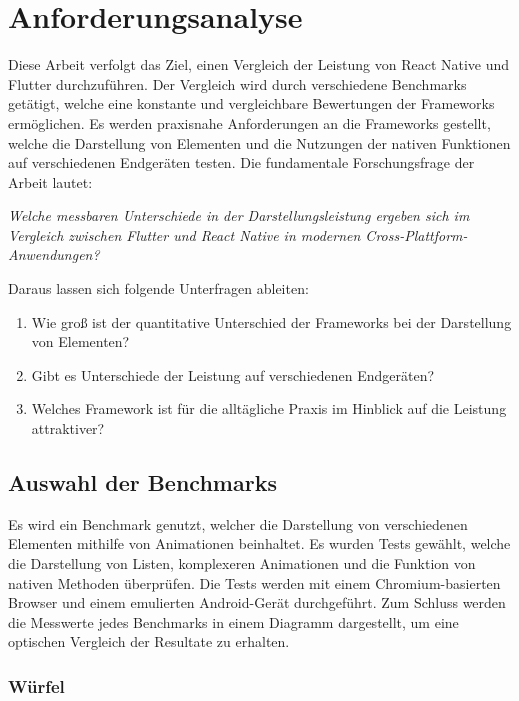 \section{Anforderungsanalyse}

Diese Arbeit verfolgt das Ziel, einen Vergleich der Leistung von React Native und Flutter durchzuführen. Der Vergleich wird durch verschiedene Benchmarks getätigt, welche eine konstante und vergleichbare Bewertungen der Frameworks ermöglichen. Es werden praxisnahe Anforderungen an die Frameworks gestellt, welche die Darstellung von Elementen und die Nutzungen der nativen Funktionen auf verschiedenen Endgeräten testen. Die fundamentale Forschungsfrage der Arbeit lautet:

\textit{Welche messbaren Unterschiede in der Darstellungsleistung ergeben sich im Vergleich zwischen Flutter und React Native in modernen Cross-Plattform-Anwendungen?}

Daraus lassen sich folgende Unterfragen ableiten:

\begin{enumerate}
    \item Wie groß ist der quantitative Unterschied der Frameworks bei der Darstellung von Elementen?
    \item Gibt es Unterschiede der Leistung auf verschiedenen Endgeräten?
    \item Welches Framework ist für die alltägliche Praxis im Hinblick auf die Leistung attraktiver?
\end{enumerate}

\subsection{Auswahl der Benchmarks}

Es wird ein Benchmark genutzt, welcher die Darstellung von verschiedenen Elementen mithilfe von Animationen beinhaltet. Es wurden Tests gewählt, welche die Darstellung von Listen, komplexeren Animationen und die Funktion von nativen Methoden überprüfen. Die Tests werden mit einem Chromium-basierten Browser und einem emulierten Android-Gerät durchgeführt. Zum Schluss werden die Messwerte jedes Benchmarks in einem Diagramm dargestellt, um eine optischen Vergleich der Resultate zu erhalten.

\subsubsection*{Würfel}

